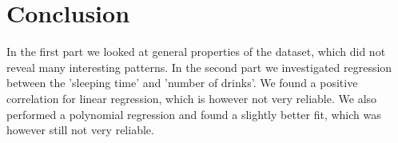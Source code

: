 \documentclass[11pt,a4paper,onecolumn]{article}
\begin{document}
\section{Conclusion}
In the first part we looked at general properties of the dataset, which did not reveal many interesting patterns. In the second part we investigated regression between the 'sleeping time' and 'number of drinks'. We found a positive correlation for linear regression, which is however not very reliable. We also performed a polynomial regression and found a slightly better fit, which was however still not very reliable.
\end{document}
